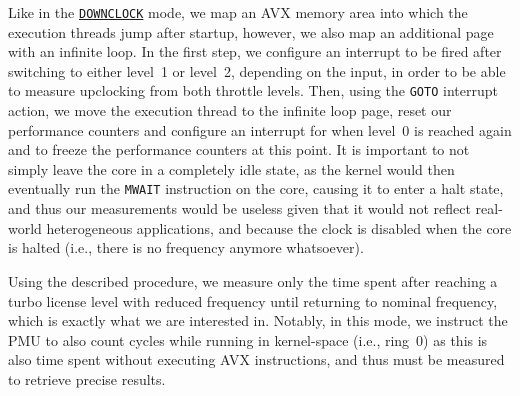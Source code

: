 Like in the \hyperref[sec:analysis:design:measurementmodes:downclock]{\texttt{DOWNCLOCK}} mode, we map an \gls{AVX} memory area into which the execution threads jump after startup, however, we also map an additional page with an infinite loop. In the first step, we configure an interrupt to be fired after switching to either level~1 or level~2, depending on the input, in order to be able to measure upclocking from both throttle levels. Then, using the \texttt{GOTO} interrupt action, we move the execution thread to the infinite loop page, reset our performance counters and configure an interrupt for when level~0 is reached again and to freeze the performance counters at this point. It is important to not simply leave the core in a completely idle state, as the kernel would then eventually run the \texttt{MWAIT} \cite{intelsdminstructionreference} instruction on the core, causing it to enter a halt state, and thus our measurements would be useless given that it would not reflect real-world heterogeneous applications, and because the clock is disabled when the core is halted (i.e., there is no frequency anymore whatsoever).

Using the described procedure, we measure only the time spent after reaching a turbo license level with reduced frequency until returning to nominal frequency, which is exactly what we are interested in. Notably, in this mode, we instruct the \gls{PMU} to also count cycles while running in kernel-space (i.e., ring~$0$) as this is also time spent without executing \gls{AVX} instructions, and thus must be measured to retrieve precise results.

